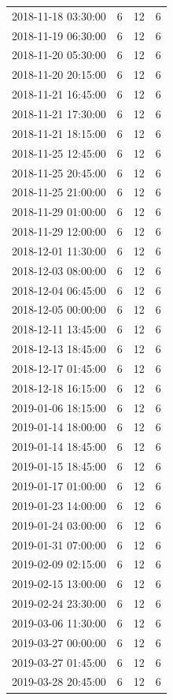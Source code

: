 \begin{tabular}{lrrr}
2018-11-18 03:30:00 & 6 & 12 & 6 \\
2018-11-19 06:30:00 & 6 & 12 & 6 \\
2018-11-20 05:30:00 & 6 & 12 & 6 \\
2018-11-20 20:15:00 & 6 & 12 & 6 \\
2018-11-21 16:45:00 & 6 & 12 & 6 \\
2018-11-21 17:30:00 & 6 & 12 & 6 \\
2018-11-21 18:15:00 & 6 & 12 & 6 \\
2018-11-25 12:45:00 & 6 & 12 & 6 \\
2018-11-25 20:45:00 & 6 & 12 & 6 \\
2018-11-25 21:00:00 & 6 & 12 & 6 \\
2018-11-29 01:00:00 & 6 & 12 & 6 \\
2018-11-29 12:00:00 & 6 & 12 & 6 \\
2018-12-01 11:30:00 & 6 & 12 & 6 \\
2018-12-03 08:00:00 & 6 & 12 & 6 \\
2018-12-04 06:45:00 & 6 & 12 & 6 \\
2018-12-05 00:00:00 & 6 & 12 & 6 \\
2018-12-11 13:45:00 & 6 & 12 & 6 \\
2018-12-13 18:45:00 & 6 & 12 & 6 \\
2018-12-17 01:45:00 & 6 & 12 & 6 \\
2018-12-18 16:15:00 & 6 & 12 & 6 \\
2019-01-06 18:15:00 & 6 & 12 & 6 \\
2019-01-14 18:00:00 & 6 & 12 & 6 \\
2019-01-14 18:45:00 & 6 & 12 & 6 \\
2019-01-15 18:45:00 & 6 & 12 & 6 \\
2019-01-17 01:00:00 & 6 & 12 & 6 \\
2019-01-23 14:00:00 & 6 & 12 & 6 \\
2019-01-24 03:00:00 & 6 & 12 & 6 \\
2019-01-31 07:00:00 & 6 & 12 & 6 \\
2019-02-09 02:15:00 & 6 & 12 & 6 \\
2019-02-15 13:00:00 & 6 & 12 & 6 \\
2019-02-24 23:30:00 & 6 & 12 & 6 \\
2019-03-06 11:30:00 & 6 & 12 & 6 \\
2019-03-27 00:00:00 & 6 & 12 & 6 \\
2019-03-27 01:45:00 & 6 & 12 & 6 \\
2019-03-28 20:45:00 & 6 & 12 & 6 \\

\end{tabular}
